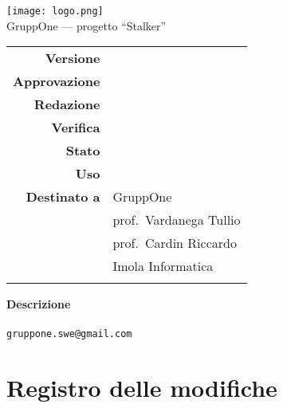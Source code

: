 \thispagestyle{empty}

\begin{center}

  \texttt{[image: logo.png]}\\
  {\Large GruppOne --- progetto ``Stalker''}\\
  \vspace{1.5cm}

  {\Huge \thetitle}
  \vspace{1.5cm}

  \begin{table}[H]
    \centering

    \begin{tabular}{r|l} %
      \textbf{Versione}                   & \versione{}             \\
      \textbf{Approvazione}               & \responsabile{}         \\
      \textbf{Redazione}                  & \redattori{}            \\
      \textbf{Verifica}                   & \verificatori{}         \\
      \textbf{Stato}                      & \stato{}                \\
      \textbf{Uso}                        & \uso{}                  \\
      \textbf{Destinato a}
                                          & GruppOne                \\
                                          & prof.\ Vardanega Tullio \\
                                          & prof.\ Cardin Riccardo  \\
      \ifthenelse{\equal{\uso}{Esterno}}{ & Imola Informatica       \\ }{}
    \end{tabular}
  \end{table}

  \vfill
  \textbf{Descrizione}\\
  \descrizione{}\\
  \verb|gruppone.swe@gmail.com|
\end{center}

\newpage
\thispagestyle{nopage}

\section*{Registro delle modifiche}%
\label{sec:registro_delle_modifiche}

